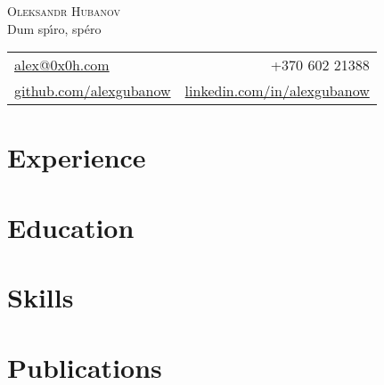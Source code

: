 \documentclass[11pt,a4paper]{article}
\makeatletter
\newcommand{\contactInfo}{
  \begin{tabular*}{\textwidth}{l@{\extracolsep{\fill}}r}
    \href{mailto:alex@0x0h.com}{alex@0x0h.com} & +370 602 21388 \\
    \href{https://github.com/alexgubanow}{github.com/alexgubanow} & \href{https://linkedin.com/in/alexgubanow}{linkedin.com/in/alexgubanow} \\
  \end{tabular*}
}
\makeatother
\begin{document}
\pagestyle{empty}

\begin{center}
  {\Huge \scshape Oleksandr Hubanov} \\[1pt]
  Dum sp\'{\i}ro, sp\'{e}ro \\
\end{center}

\vspace{1em}
\contactInfo

\vspace{1.5em}

\section*{Experience}


\section*{Education}


\section*{Skills}


\section*{Publications}

\end{document}
